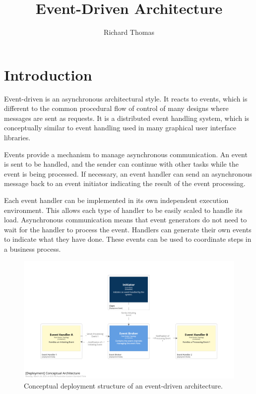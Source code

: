 \title{Event-Driven Architecture}
\author{Richard Thomas}

\maketitle

\section{Introduction}\label{sec:intro}

Event-driven is an asynchronous architectural style.
It reacts to events, which is different to the common procedural flow of control of many designs where messages are sent as requests.
It is a distributed event handling system, which is conceptually similar to event handling used in many graphical user interface libraries.

Events provide a mechanism to manage asynchronous communication.
An event is sent to be handled, and the sender can continue with other tasks while the event is being processed.
If necessary, an event handler can send an asynchronous message back to an event initiator indicating the result of the event processing.

Each event handler can be implemented in its own independent execution environment.
This allows each type of handler to be easily scaled to handle its load.
Asynchronous communication means that event generators do not need to wait for the handler to process the event.
Handlers can generate their own events to indicate what they have done.
These events can be used to coordinate steps in a business process.

\begin{figure}[h!]
    \begin{adjustwidth}{-10mm}{-10mm}
        \centering
        \includegraphics[trim=195 230 195 162,clip,width=0.95\paperwidth]{diagrams/conceptual-architecture.png}
    \end{adjustwidth}
    \caption{Conceptual deployment structure of an event-driven architecture.}
    \label{fig:conceptual-architecture}
\end{figure}

